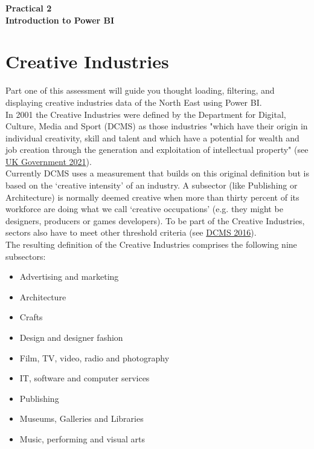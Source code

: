\documentclass[11pt]{article}
\begin{document}
\pagestyle{fancy}
\renewcommand{\headrulewidth}{0pt}

\begin{center}
\vspace*{1cm}
{\textbf {\Huge Practical 2}}\\
\vspace*{0.5cm}
{\textbf {\huge Introduction to Power BI}}
\vspace*{1cm}
\end{center}

\section{Creative Industries}

Part one of this assessment will guide you thought loading, filtering, and displaying creative industries data of the North East using Power BI.\\

In 2001 the Creative Industries were defined by the Department for Digital, Culture, Media and Sport (DCMS) as those industries "which have their origin in individual creativity, skill and talent and which have a potential for wealth and job creation through the generation and exploitation of intellectual property" (see \href{https://www.gov.uk/government/publications/dcms-sectors-economic-estimates-methodology}{UK Government 2021}).\\

Currently DCMS uses a measurement that builds on this original definition but is based on the ‘creative intensity’ of an industry. A subsector (like Publishing or Architecture) is normally deemed creative when more than thirty percent of its workforce are doing what we call ‘creative occupations’ (e.g. they might be designers, producers or games developers). To be part of the Creative Industries, sectors also have to meet other threshold criteria (see \href{https://assets.publishing.service.gov.uk/government/uploads/system/uploads/attachment_data/file/499683/CIEE_Methodology.pdf}{DCMS 2016}).\\

The resulting definition of the Creative Industries comprises the following nine subsectors:

\begin{itemize}
    \itemsep0em 
    \item  Advertising and marketing
    \item  Architecture
    \item  Crafts
    \item  Design and designer fashion
    \item  Film, TV, video, radio and photography
    \item  IT, software and computer services
    \item  Publishing
    \item  Museums, Galleries and Libraries
    \item  Music, performing and visual arts
\end{itemize}
\end{document}
